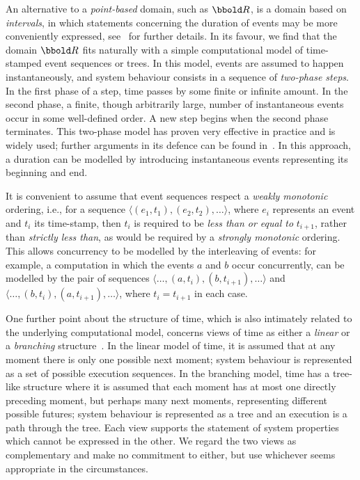 An alternative to a \emph{point-based} domain, such as $\Time$, is a
domain based on \emph{intervals}, in which statements concerning the
duration of events may be more conveniently expressed,
see~\cite{koy:91} for further details.  In its favour, we find that
the domain $\Time$ fits naturally with a simple computational model of
time-stamped event sequences or trees.  In this model, events are
assumed to happen instantaneously, and system behaviour consists in a
sequence of \emph{two-phase steps}. In the first phase of a step, time
passes by some finite or infinite amount. In the second phase, a
finite, though arbitrarily large, number of instantaneous events occur
in some well-defined order. A new step begins when the second phase
terminates.  This two-phase model has proven very effective in
practice and is widely used; further arguments in its defence can be
found in~\cite{ns:91}. In this approach, a duration can be modelled by
introducing instantaneous events representing its beginning and end.

It is convenient to assume that event sequences respect a \emph{weakly
monotonic} ordering, i.e., for a sequence $\langle(e_1,t_1),
(e_2,t_2),\ldots\rangle$, where $e_i$ represents an event and $t_i$
its time-stamp, then $t_i$ is required to be
\emph{less than or equal to} $t_{i+1}$, rather than \emph{strictly
less than}, as would be required by a \emph{strongly monotonic}
ordering. This allows concurrency to be modelled by the interleaving
of events: for example, a computation in which the events $a$ and $b$
occur concurrently, can be modelled by the pair of sequences
$\langle\ldots, (a, t_i), (b,t_{i+1}),\ldots\rangle$ and
$\langle\ldots, (b,t_i), (a,t_{i+1}),\ldots\rangle$, where $t_i =
t_{i+1}$ in each case.  

One further point about the structure of time, which is also
intimately related to the underlying computational model, concerns
views of time as either a \emph{linear} or a \emph{branching}
structure~\cite{eh:86,lam:80,pnu:85}. In the linear model of time, it
is assumed that at any moment there is only one possible next moment;
system behaviour is represented as a set of possible execution
sequences. In the branching model, time has a tree-like structure
where it is assumed that each moment has at most one directly
preceding moment, but perhaps many next moments,
representing different possible futures; system behaviour is
represented as a tree and an execution is a path through the
tree. Each view supports the statement of system properties which
cannot be expressed in the other. We regard the two views as
complementary and make no commitment to either, but use whichever
seems appropriate in the circumstances.
   
